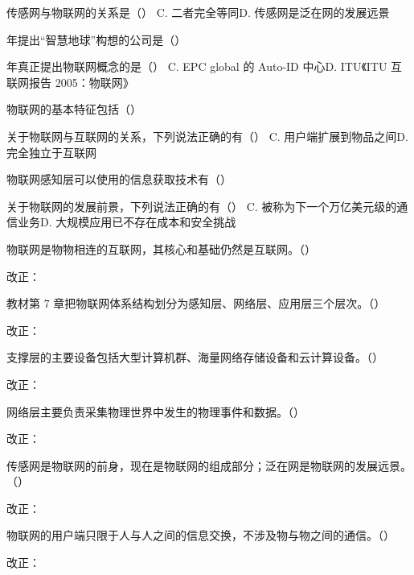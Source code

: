 \documentclass[a4paper,11pt]{article}
\begin{document}
\q 传感网与物联网的关系是（\quad）
{C. 二者完全等同}{D. 传感网是泛在网的发展远景}

 年提出“智慧地球”构想的公司是（\quad）

 年真正提出物联网概念的是（\quad）
{C. EPC global 的 Auto-ID 中心}{D. ITU《ITU 互联网报告 2005：物联网》}

\q 物联网的基本特征包括（\quad）

\q 关于物联网与互联网的关系，下列说法正确的有（\quad）
{C. 用户端扩展到物品之间}{D. 完全独立于互联网}

\q 物联网感知层可以使用的信息获取技术有（\quad）

\q 关于物联网的发展前景，下列说法正确的有（\quad）
{C. 被称为下一个万亿美元级的通信业务}{D. 大规模应用已不存在成本和安全挑战}

\q 物联网是物物相连的互联网，其核心和基础仍然是互联网。\quad（\quad）\par\noindent 改正：\fixblank

\q 教材第 7 章把物联网体系结构划分为感知层、网络层、应用层三个层次。\quad（\quad）\par\noindent 改正：\fixblank

\q 支撑层的主要设备包括大型计算机群、海量网络存储设备和云计算设备。\quad（\quad）\par\noindent 改正：\fixblank

\q 网络层主要负责采集物理世界中发生的物理事件和数据。\quad（\quad）\par\noindent 改正：\fixblank

\q 传感网是物联网的前身，现在是物联网的组成部分；泛在网是物联网的发展远景。\quad（\quad）\par\noindent 改正：\fixblank

\q 物联网的用户端只限于人与人之间的信息交换，不涉及物与物之间的通信。\quad（\quad）\par\noindent 改正：\fixblank
\end{document}

